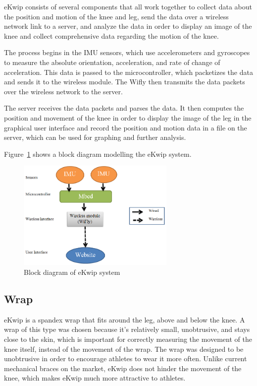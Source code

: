 eKwip consists of several components that all work together to collect data about the position and motion of the knee and leg, send the data over a wireless network link to a server, and analyze the data in order to display an image of the knee and collect comprehensive data regarding the motion of the knee.

The process begins in the IMU sensors, which use accelerometers and gyroscopes to measure the absolute orientation, acceleration, and rate of change of acceleration. This data is passed to the microcontroller, which packetizes the data and sends it to the wireless module. The Wifly then transmits the data packets over the wireless network to the server.

The server receives the data packets and parses the data. It then computes the position and movement of the knee in order to display the image of the leg in the graphical user interface and record the position and motion data in a file on the server, which can be used for graphing and further analysis.

Figure~\ref{fig:block_diagram} shows a block diagram modelling the eKwip system.

\begin{figure}[h]
  \begin{center}
    \includegraphics[width=3in]{images/block_diagram.PNG}
  \end{center}
  \caption{Block diagram of eKwip system}
  \label{fig:block_diagram}
\end{figure}

\subsection {Wrap}
eKwip is a spandex wrap that fits around the leg, above and below the knee. A wrap of this type was chosen because it's relatively small, unobtrusive, and stays close to the skin, which is important for correctly measuring the movement of the knee itself, instead of the movement of the wrap. The wrap was designed to be unobtrusive in order to encourage athletes to wear it more often. Unlike current mechanical braces on the market, eKwip does not hinder the movement of the knee, which makes eKwip much more attractive to athletes.

